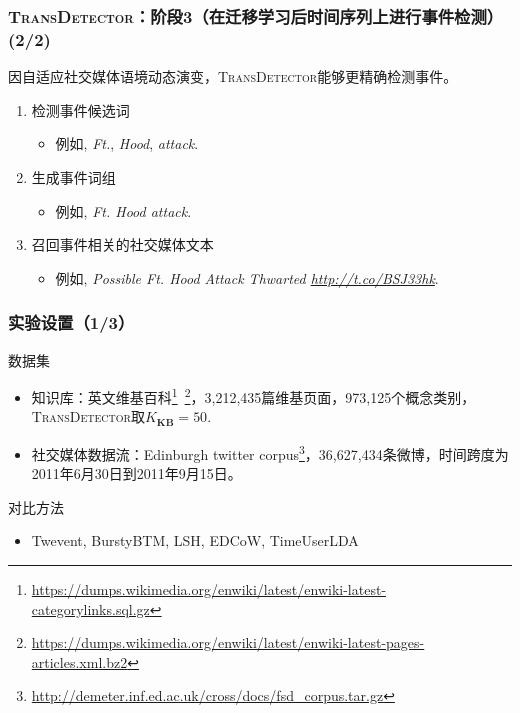 \begin{frame}
\frametitle{\textsc{TransDetector}：阶段3（在迁移学习后时间序列上进行事件检测） (2/2)}
因自适应社交媒体语境动态演变，\textsc{TransDetector}能够更精确检测事件。
\begin{enumerate}
	\item 检测事件候选词
	\begin{itemize}
		\item 例如, \textit{Ft.}, \textit{Hood}, \textit{attack}.
	\end{itemize}
	\item 生成事件词组
	\begin{itemize}
		\item 例如, \textit{Ft. Hood attack}.
	\end{itemize}
	\item 召回事件相关的社交媒体文本
	\begin{itemize}
		\item 例如, \textit{Possible Ft. Hood Attack Thwarted \url{http://t.co/BSJ33hk}}.
	\end{itemize}
\end{enumerate}
\end{frame}


\begin{frame}
\frametitle{实验设置（1/3）}
\noindent 数据集
\begin{itemize}
	\item 知识库：英文维基百科\footnote{\tiny{\url{https://dumps.wikimedia.org/enwiki/latest/enwiki-latest-categorylinks.sql.gz}}}\ \footnote{\tiny{\url{https://dumps.wikimedia.org/enwiki/latest/enwiki-latest-pages-articles.xml.bz2}}}，3,212,435篇维基页面，973,125个概念类别，\textsc{TransDetector}取$K_{\bm{KB}}=50$.
	\item 社交媒体数据流：Edinburgh twitter corpus\footnote{\tiny{\url{http://demeter.inf.ed.ac.uk/cross/docs/fsd_corpus.tar.gz}}}，36,627,434条微博，时间跨度为2011年6月30日到2011年9月15日。
\end{itemize} 
对比方法
\begin{itemize}
	\item Twevent, BurstyBTM, LSH, EDCoW, TimeUserLDA
\end{itemize}
\end{frame}

